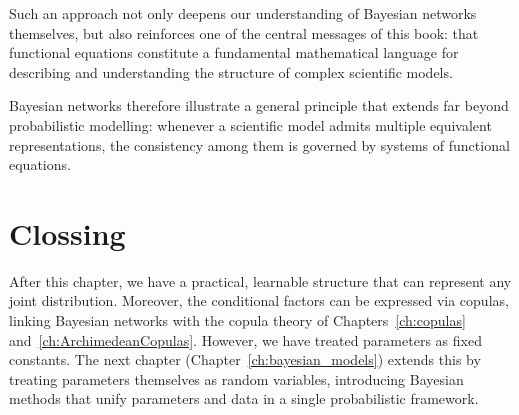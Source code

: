 Such an approach not only deepens our understanding of Bayesian networks themselves, but also reinforces one of the central messages of this book: that functional equations constitute a fundamental mathematical language for describing and understanding the structure of complex scientific models.

Bayesian networks therefore illustrate a general principle that extends far beyond probabilistic modelling: whenever a scientific model admits multiple equivalent representations, the consistency among them is governed by systems of functional equations.

\section{Clossing}

After this chapter, we have a practical, learnable structure that can represent any joint distribution. Moreover, the conditional factors can be expressed via copulas, linking Bayesian networks with the copula theory of Chapters~\ref{ch:copulas} and~\ref{ch:ArchimedeanCopulas}. However, we have treated parameters as fixed constants. The next chapter (Chapter~\ref{ch:bayesian_models}) extends this by treating parameters themselves as random variables, introducing Bayesian methods that unify parameters and data in a single probabilistic framework. 